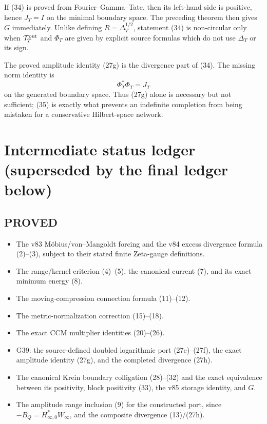 \documentclass[11pt]{article}
\begin{document}
If (34) is proved from Fourier--Gamma--Tate, then its left-hand side is
positive, hence $J_T=I$ on the minimal boundary space.  The preceding theorem
then gives $G$ immediately.  Unlike defining
$R=\Delta_T^{1/2}$, statement (34) is non-circular only when
$\mathcal T_T^{\rm out}$ and $\Phi_T$ are given by explicit source formulas
which do not use $\Delta_T$ or its sign.

The proved amplitude identity (27g) is the divergence part of (34).  The missing
norm identity is
\begin{equation}
 \Phi_T^*\Phi_T=J_T                                    \tag{35}
\end{equation}
on the generated boundary space.  Thus (27g) alone is necessary but not
sufficient; (35) is exactly what prevents an indefinite completion from being
mistaken for a conservative Hilbert-space network.

\section{Intermediate status ledger (superseded by the final ledger below)}

\subsection*{PROVED}
\begin{itemize}
\item The v83 Möbius/von--Mangoldt forcing and the v84 excess divergence
      formula (2)--(3), subject to their stated finite Zeta-gauge definitions.
\item The range/kernel criterion (4)--(5), the canonical current (7), and its
      exact minimum energy (8).
\item The moving-compression connection formula (11)--(12).
\item The metric-normalization correction (15)--(18).
\item The exact CCM multiplier identities (20)--(26).
\item G39: the source-defined doubled logarithmic port (27e)--(27f), the exact
      amplitude identity (27g), and the completed divergence (27h).
\item The canonical Krein boundary colligation (28)--(32) and the exact
      equivalence between its positivity, block positivity (33), the v85
      storage identity, and $G$.
\item The amplitude range inclusion (9) for the constructed port, since
      $-B_Q=H_{\infty,0}^*W_\infty$, and the composite divergence (13)/(27h).
\end{itemize}
\end{document}
